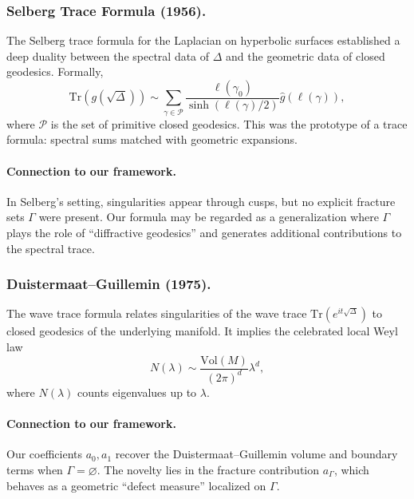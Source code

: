 \subsubsection{Selberg Trace Formula (1956).}
The Selberg trace formula \cite{Selberg1956} for the Laplacian on
hyperbolic surfaces established a deep duality between the spectral
data of $\Delta$ and the geometric data of closed geodesics.
Formally,
\[
\mathrm{Tr}(g(\sqrt{\Delta})) \sim \sum_{\gamma \in \mathcal{P}} \frac{\ell(\gamma_0)}{\sinh(\ell(\gamma)/2)} \widehat{g}(\ell(\gamma)),
\]
where $\mathcal{P}$ is the set of primitive closed geodesics.
This was the prototype of a trace formula: spectral sums matched with
geometric expansions.

\paragraph{Connection to our framework.}
In Selberg’s setting, singularities appear through cusps, but no explicit
fracture sets $\Gamma$ were present. Our formula may be regarded as a
generalization where $\Gamma$ plays the role of “diffractive geodesics”
and generates additional contributions to the spectral trace.


\subsubsection{Duistermaat–Guillemin (1975).}
The wave trace formula \cite{DG1975} relates singularities of the wave
trace $\mathrm{Tr}(e^{it\sqrt{\Delta}})$ to closed geodesics of the
underlying manifold. It implies the celebrated local Weyl law
\[
N(\lambda) \sim \frac{\mathrm{Vol}(M)}{(2\pi)^d}\lambda^d,
\]
where $N(\lambda)$ counts eigenvalues up to $\lambda$.

\paragraph{Connection to our framework.}
Our coefficients $a_0, a_1$ recover the Duistermaat–Guillemin volume and
boundary terms when $\Gamma = \varnothing$. The novelty lies in the
fracture contribution $a_\Gamma$, which behaves as a geometric “defect
measure” localized on $\Gamma$.


